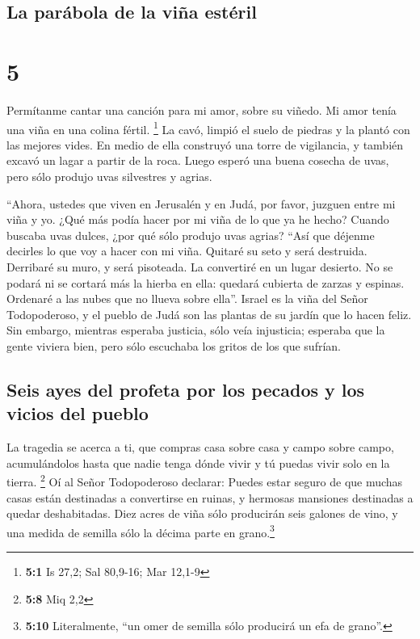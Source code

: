 \hypertarget{la-paruxe1bola-de-la-viuxf1a-estuxe9ril}{%
\subsection{La parábola de la viña
estéril}\label{la-paruxe1bola-de-la-viuxf1a-estuxe9ril}}

\hypertarget{section-4}{%
\section{5}\label{section-4}}

 Permítanme cantar una canción para mi amor, sobre su
viñedo. Mi amor tenía una viña en una colina fértil. \footnote{\textbf{5:1}
  Is 27,2; Sal 80,9-16; Mar 12,1-9}  La cavó, limpió el
suelo de piedras y la plantó con las mejores vides. En medio de ella
construyó una torre de vigilancia, y también excavó un lagar a partir de
la roca. Luego esperó una buena cosecha de uvas, pero sólo produjo uvas
silvestres y agrias.

 ``Ahora, ustedes que viven en Jerusalén y en Judá, por
favor, juzguen entre mi viña y yo.  ¿Qué más podía hacer
por mi viña de lo que ya he hecho? Cuando buscaba uvas dulces, ¿por qué
sólo produjo uvas agrias?  ``Así que déjenme decirles lo
que voy a hacer con mi viña. Quitaré su seto y será destruida. Derribaré
su muro, y será pisoteada.  La convertiré en un lugar
desierto. No se podará ni se cortará más la hierba en ella: quedará
cubierta de zarzas y espinas. Ordenaré a las nubes que no llueva sobre
ella''.  Israel es la viña del Señor Todopoderoso, y el
pueblo de Judá son las plantas de su jardín que lo hacen feliz. Sin
embargo, mientras esperaba justicia, sólo veía injusticia; esperaba que
la gente viviera bien, pero sólo escuchaba los gritos de los que
sufrían.

\hypertarget{seis-ayes-del-profeta-por-los-pecados-y-los-vicios-del-pueblo}{%
\subsection{Seis ayes del profeta por los pecados y los vicios del
pueblo}\label{seis-ayes-del-profeta-por-los-pecados-y-los-vicios-del-pueblo}}

 La tragedia se acerca a ti, que compras casa sobre casa y
campo sobre campo, acumulándolos hasta que nadie tenga dónde vivir y tú
puedas vivir solo en la tierra. \footnote{\textbf{5:8} Miq 2,2}
 Oí al Señor Todopoderoso declarar: Puedes estar seguro de
que muchas casas están destinadas a convertirse en ruinas, y hermosas
mansiones destinadas a quedar deshabitadas.  Diez acres
de viña sólo producirán seis galones de vino, y una medida de semilla
sólo la décima parte en grano.\footnote{\textbf{5:10} Literalmente, ``un
  omer de semilla sólo producirá un efa de grano''.}

